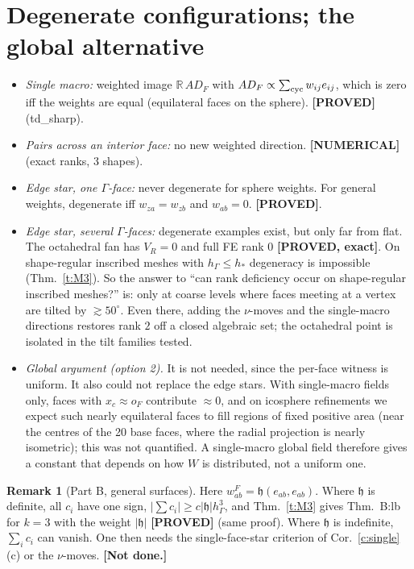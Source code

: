 \documentclass[11pt]{article}
\theoremstyle{definition}
\newtheorem{remark}[theorem]{Remark}
\newcommand{\hG}{h_\Gamma}
\newcommand{\hh}{\mathfrak h}
\newcommand{\status}[1]{\textbf{[#1]}}
\begin{document}
\section{Degenerate configurations; the global alternative}
\begin{itemize}[leftmargin=1.2em]
\item \emph{Single macro:} weighted image $\mathbb R\,A D_F$ with $A D_F\propto\sum_{\rm cyc}w_{ij}e_{ij}$, which is zero iff the weights are equal (equilateral faces on the sphere). \status{PROVED} (td\_sharp).
\item \emph{Pairs across an interior face:} no new weighted direction. \status{NUMERICAL} (exact ranks, 3 shapes).
\item \emph{Edge star, one $\Gamma$-face:} never degenerate for sphere weights. For general weights, degenerate iff $w_{za}=w_{zb}$ and $w_{ab}=0$. \status{PROVED}.
\item \emph{Edge star, several $\Gamma$-faces:} degenerate examples exist, but only far from flat. The octahedral fan has $V_R=0$ and full FE rank $0$ \status{PROVED, exact}. On shape-regular inscribed meshes with $\hG\le h_\ast$ degeneracy is impossible (Thm.~\ref{t:M3}). So the answer to ``can rank deficiency occur on shape-regular inscribed meshes?'' is: only at coarse levels where faces meeting at a vertex are tilted by $\gtrsim50^\circ$. Even there, adding the $\nu$-moves and the single-macro directions restores rank $2$ off a closed algebraic set; the octahedral point is isolated in the tilt families tested.
\item \emph{Global argument (option 2).} It is not needed, since the per-face witness is uniform. It also could not replace the edge stars. With single-macro fields only, faces with $x_c\approx o_F$ contribute $\approx0$, and on icosphere refinements we expect such nearly equilateral faces to fill regions of fixed positive area (near the centres of the 20 base faces, where the radial projection is nearly isometric); this was not quantified. A single-macro global field therefore gives a constant that depends on how $W$ is distributed, not a uniform one.
\end{itemize}

\begin{remark}[Part B, general surfaces]
Here $w^{F}_{ab}=\hh(e_{ab},e_{ab})$. Where $\hh$ is definite, all $c_i$ have one sign, $|\sum c_i|\ge c|\hh|\hG^3$, and Thm.~\ref{t:M3} gives Thm.~B:lb for $k=3$ with the weight $|\hh|$ \status{PROVED} (same proof). Where $\hh$ is indefinite, $\sum_ic_i$ can vanish. One then needs the single-face-star criterion of Cor.~\ref{c:single}(c) or the $\nu$-moves. \status{Not done.}
\end{remark}
\end{document}
